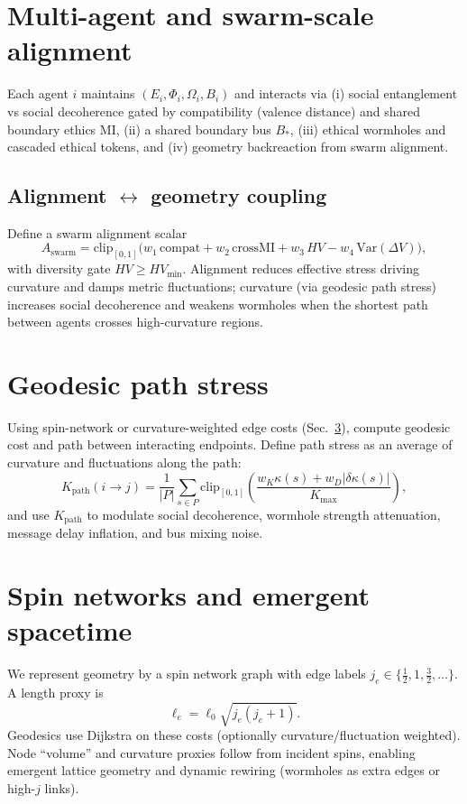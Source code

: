 \documentclass[11pt]{article}
\newcommand{\Var}{\mathrm{Var}}
\newcommand{\clip}{\mathrm{clip}}
\begin{document}
\section{Multi-agent and swarm-scale alignment}
Each agent $i$ maintains $(E_i,\Phi_i,\Omega_i,B_i)$ and interacts via (i) social entanglement vs social decoherence gated by compatibility (valence distance) and shared boundary ethics MI, (ii) a shared boundary bus $B_{\ast}$, (iii) ethical wormholes and cascaded ethical tokens, and (iv) geometry backreaction from swarm alignment.

\subsection{Alignment $\leftrightarrow$ geometry coupling}
Define a swarm alignment scalar
\begin{equation}
A_{\mathrm{swarm}} = \clip_{[0,1]}\Big(w_1\,\mathrm{compat}+w_2\,\mathrm{crossMI}+w_3\,HV - w_4\,\Var(\Delta V)\Big),
\end{equation}
with diversity gate $HV\ge HV_{\min}$. Alignment reduces effective stress driving curvature and damps metric fluctuations; curvature (via geodesic path stress) increases social decoherence and weakens wormholes when the shortest path between agents crosses high-curvature regions.

\section{Geodesic path stress}
Using spin-network or curvature-weighted edge costs (Sec.~\ref{sec:spins}), compute geodesic cost and path between interacting endpoints. Define path stress as an average of curvature and fluctuations along the path:
\begin{equation}
K_{\mathrm{path}}(i\to j)=\frac{1}{|P|}\sum_{s\in P}\clip_{[0,1]}\left(\frac{w_K\kappa(s)+w_D|\delta\kappa(s)|}{K_{\max}}\right),
\end{equation}
and use $K_{\mathrm{path}}$ to modulate social decoherence, wormhole strength attenuation, message delay inflation, and bus mixing noise.

\section{Spin networks and emergent spacetime}
\label{sec:spins}
We represent geometry by a spin network graph with edge labels $j_e\in\{\tfrac12,1,\tfrac32,\dots\}$. A length proxy is
\begin{equation}
\ell_e = \ell_0\sqrt{j_e(j_e+1)}.
\end{equation}
Geodesics use Dijkstra on these costs (optionally curvature/fluctuation weighted). Node ``volume'' and curvature proxies follow from incident spins, enabling emergent lattice geometry and dynamic rewiring (wormholes as extra edges or high-$j$ links).
\end{document}

